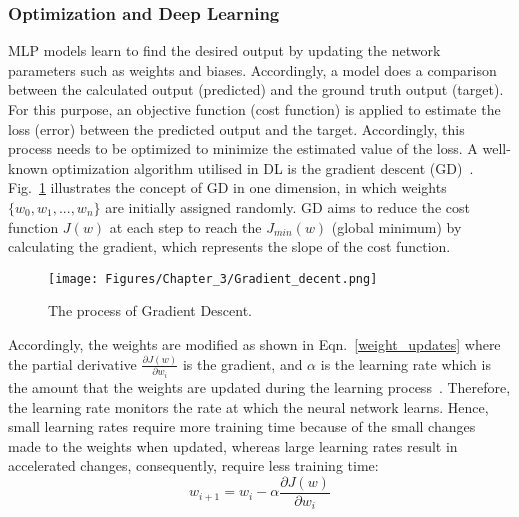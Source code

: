 \subsubsection{Optimization and Deep Learning}
MLP models learn to find the desired output by updating the network parameters such as weights and biases.
Accordingly, a model does a comparison between the calculated output (predicted) and the ground truth output (target).
For this purpose, an objective function (cost function) is applied to estimate the loss (error) between the predicted output and the target.
Accordingly, this process needs to be optimized to minimize the estimated value of the loss.
A well-known optimization algorithm utilised in DL is the gradient descent (GD)~\cite{Lecun2015}.
Fig.~\ref{fig:GD} illustrates the concept of GD in one dimension, in which weights \(\{w_0,w_1,...,w_n\}\) are initially assigned randomly.
GD aims to reduce the cost function \(J(w)\) at each step to reach the \(J_{min}(w)\) (global minimum) by calculating the gradient, which represents the slope of the cost function.
\begin{figure}[!ht]
	\begin{center}
		\centering
		\texttt{[image: Figures/Chapter\_3/Gradient\_decent.png]}
	\end{center}
	\caption{The process of Gradient Descent.} 
	\label{fig:GD}
\end{figure}
Accordingly, the weights are modified as shown in Eqn.~\ref{weight_updates} where the partial derivative \(\frac{\partial J(w)}{\partial w_i}\) is the gradient, and \(\alpha \) is the learning rate which is the amount that the weights are updated during the learning process~\cite{Russell2010}.
Therefore, the learning rate monitors the rate at which the neural network learns.
Hence, small learning rates require more training time because of the small changes made to the weights when updated, whereas large learning rates result in accelerated changes, consequently, require less training time:
\begin{equation}
	w_{i+1}= w_{i} -\alpha \frac{\partial J(w)}{\partial w_i} 
	\label{weight_updates}
\end{equation}

